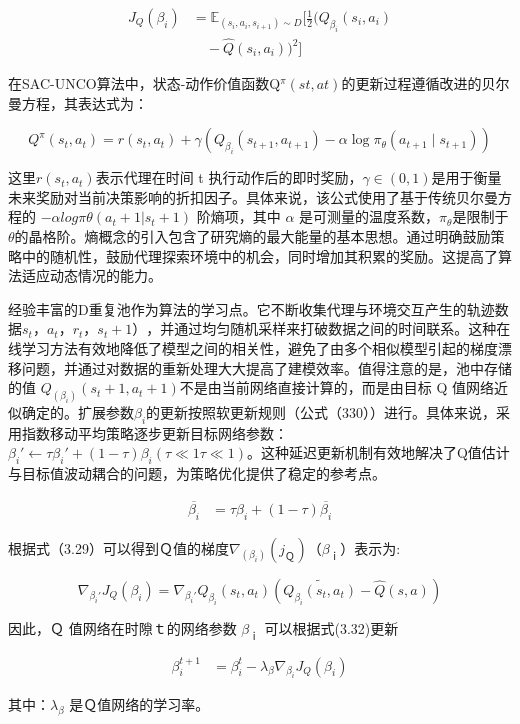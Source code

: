 \begin{equation}
	\begin{split}
		J_{Q}(\beta_{i}) 
		&= \mathbb{E}_{(s_i, a_i, s_{i+1}) \sim D} \bigg[ \frac{1}{2} \Big( Q_{\beta_i}(s_i, a_i) \\
		&\quad - \hat{Q}(s_i, a_i) \Big)^2 \bigg]
	\end{split}
\end{equation}

在SAC-UNCO算法中，状态-动作价值函数Q\(^π(st,at)\)的更新过程遵循改进的贝尔曼方程，其表达式为：

\begin{equation}
	Q^{\pi}(s_t, a_t) = r(s_t, a_t) + \gamma \left( Q_{\beta_i}(s_{t+1}, a_{t+1}) - \alpha \log \pi_{\theta}(a_{t+1} \mid s_{t+1}) \right)
\end{equation}

这里\(r(s_t,a_t)\)表示代理在时间 t 执行动作后的即时奖励，\(γ∈(0,1)\)是用于衡量未来奖励对当前决策影响的折扣因子。具体来说，该公式使用了基于传统贝尔曼方程的 \(−αlog⁡πθ(a_t+1|s_t+1)\) 阶熵项，其中 \(α\) 是可测量的温度系数，\(π_θ\)是限制于 \(θ\)的晶格阶。熵概念的引入包含了研究熵的最大能量的基本思想。通过明确鼓励策略中的随机性，鼓励代理探索环境中的机会，同时增加其积累的奖励。这提高了算法适应动态情况的能力。

经验丰富的D重复池作为算法的学习点。它不断收集代理与环境交互产生的轨迹数据\(s_t，a_t，r_t，s_t+1）\)，并通过均匀随机采样来打破数据之间的时间联系。这种在线学习方法有效地降低了模型之间的相关性，避免了由多个相似模型引起的梯度漂移问题，并通过对数据的重新处理大大提高了建模效率。值得注意的是，池中存储的值 \(Q_(β_i)(s_t+1,a_t+1)\)不是由当前网络直接计算的，而是由目标 Q 值网络近似确定的。扩展参数\(β_i\)的更新按照软更新规则（公式（330））进行。具体来说，采用指数移动平均策略逐步更新目标网络参数：\(β_i′​←τβ_i′​+(1−τ)β_i(τ≪1τ≪1)\)。这种延迟更新机制有效地解决了Q值估计与目标值波动耦合的问题，为策略优化提供了稳定的参考点。

\begin{align}
	\overline{\beta_i} &= \tau \beta_i + (1 - \tau) \overline{\beta_i}
\end{align}

根据式（3.29）可以得到Ｑ值的梯度\(∇_(β_i) (j_Ｑ)（ β_ｉ）\)表示为:

\begin{equation}
	\nabla_{\beta_i'} J_Q(\beta_i) = \nabla_{\beta_i'} Q_{\beta_i}(s_t, a_t) \left( \widetilde{Q_{\beta_i}(s_t, a_t)} - \hat{Q}(s, a) \right)
\end{equation}

因此，Ｑ 值网络在时隙ｔ的网络参数 \(β_ｉ\) 可以根据式(3.32)更新

\begin{align}
	\beta_{i}^{t+1} &= \beta_{i}^{t} - \lambda_{\beta} \nabla_{\beta_{i}} J_{Q}(\beta_{i})
\end{align}

其中：\(λ_β\) 是Ｑ值网络的学习率。































